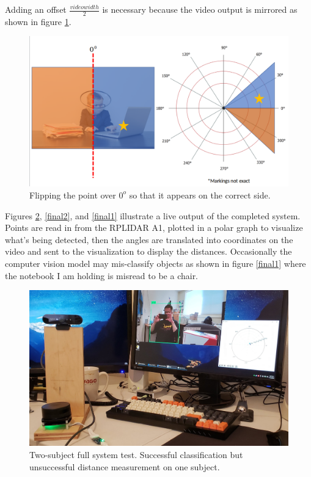 \documentclass[onecolumn, draftclsnofoot,10pt, compsoc]{IEEEtran}
\makeatletter
\newcommand\captionof[1]{\def\@captype{#1}\caption}
\makeatother
\begin{document}
\begin{singlespace}
		Adding an offset \(\frac{video width}{2}\) is necessary because the video output is mirrored as shown in figure \ref{reverse}.

		\begin{figure}[H]
		\includegraphics[scale=0.3]{reverse.png}
		\captionof{figure}{Flipping the point over \(0^o\) so that it appears on the correct side.}
		\label{reverse}
		\end{figure}

		Figures \ref{final3}, \ref{final2}, and \ref{final1} illustrate a live output of the completed system.
		Points are read in from the RPLIDAR A1, plotted in a polar graph to visualize what's being detected, then the angles are translated into coordinates on the video and sent to the visualization to display the distances.
		Occasionally the computer vision model may mis-classify objects as shown in figure \ref{final1} where the notebook I am holding is misread to be a chair.

		\begin{figure}[H]
		\includegraphics[scale=0.15]{final3.jpg}
		\captionof{figure}{Two-subject full system test. Successful classification but unsuccessful distance measurement on one subject.}
		\label{final3}
		\end{figure}


\end{singlespace}
\end{document}
